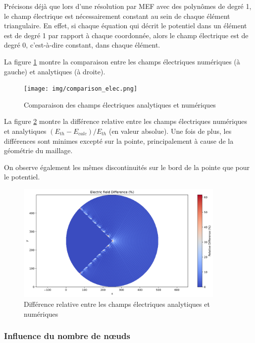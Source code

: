 \documentclass{article}
\begin{document}
Précisons déjà que lors d'une résolution par MEF avec des polynômes
de degré 1, le champ électrique est nécessairement constant
au sein de chaque élément triangulaire. En effet, si chaque
équation qui décrit le potentiel dans un élément est de degré 1
par rapport à chaque coordonnée, alors le champ électrique
est de degré 0, c'est-à-dire constant, dans chaque élément.

\newpage

La figure \ref{fig:field_comparison} montre la comparaison
entre les champs électriques
numériques (à gauche) et analytiques (à droite).


\begin{figure}[!h]
    \centering
    \texttt{[image: img/comparison\_elec.png]}
    \caption{Comparaison des champs électriques analytiques et numériques}
    \label{fig:field_comparison}
\end{figure}

La figure \ref{fig:field_diff} montre la différence relative entre
les champs électriques numériques et analytiques
$(E_{th} - E_{calc}) / E_{th}$ (en valeur absolue). Une fois
de plus, les différences sont minimes excepté sur la pointe,
principalement à cause de la géométrie du maillage.

On observe également les mêmes discontinuités sur le bord
de la pointe que pour le potentiel.

\begin{figure}[!h]
    \centering
    \includegraphics[width=0.9\textwidth]{img/difference_elec.png}
    \caption{Différence relative entre les champs électriques analytiques et numériques}
    \label{fig:field_diff}
\end{figure}

\newpage

\subsubsection{Influence du nombre de nœuds}
\end{document}
